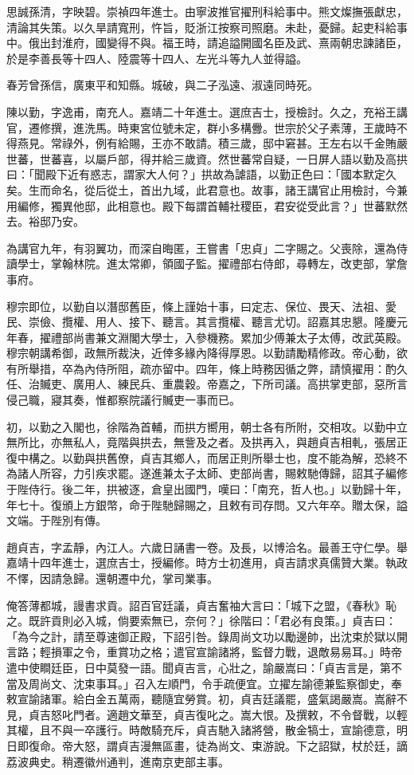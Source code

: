\begin{pinyinscope}
思誠孫清，字映碧。崇禎四年進士。由寧波推官擢刑科給事中。熊文燦撫張獻忠，清論其失策。以久旱請寬刑，忤旨，貶浙江按察司照磨。未赴，憂歸。起吏科給事中。俄出封淮府，國變得不與。福王時，請追謚開國名臣及武、熹兩朝忠諫諸臣，於是李善長等十四人、陸震等十四人、左光斗等九人並得謚。

春芳曾孫信，廣東平和知縣。城破，與二子泓遠、淑遠同時死。

陳以勤，字逸甫，南充人。嘉靖二十年進士。選庶吉士，授檢討。久之，充裕王講官，遷修撰，進洗馬。時東宮位號未定，群小多構釁。世宗於父子素薄，王歲時不得燕見。常祿外，例有給賜，王亦不敢請。積三歲，邸中窘甚。王左右以千金賄嚴世蕃，世蕃喜，以屬戶部，得并給三歲資。然世蕃常自疑，一日屏人語以勤及高拱曰：「聞殿下近有惑志，謂家大人何？」拱故為謔語，以勤正色曰：「國本默定久矣。生而命名，從后從土，首出九域，此君意也。故事，諸王講官止用檢討，今兼用編修，獨異他邸，此相意也。殿下每謂首輔社稷臣，君安從受此言？」世蕃默然去。裕邸乃安。

為講官九年，有羽翼功，而深自晦匿，王嘗書「忠貞」二字賜之。父喪除，還為侍讀學士，掌翰林院。進太常卿，領國子監。擢禮部右侍郎，尋轉左，改吏部，掌詹事府。

穆宗即位，以勤自以潛邸舊臣，條上謹始十事，曰定志、保位、畏天、法祖、愛民、崇儉、攬權、用人、接下、聽言。其言攬權、聽言尤切。詔嘉其忠懇。隆慶元年春，擢禮部尚書兼文淵閣大學士，入參機務。累加少傅兼太子太傅，改武英殿。穆宗朝講希御，政無所裁決，近倖多緣內降得厚恩。以勤請勵精修政。帝心動，欲有所舉措，卒為內侍所阻，疏亦留中。四年，條上時務因循之弊，請慎擢用：酌久任、治贓吏、廣用人、練民兵、重農穀。帝嘉之，下所司議。高拱掌吏部，惡所言侵己職，寢其奏，惟都察院議行贓吏一事而已。

初，以勤之入閣也，徐階為首輔，而拱方嚮用，朝士各有所附，交相攻。以勤中立無所比，亦無私人，竟階與拱去，無訾及之者。及拱再入，與趙貞吉相軋，張居正復中構之。以勤與拱舊僚，貞吉其鄉人，而居正則所舉士也，度不能為解，恐終不為諸人所容，力引疾求罷。遂進兼太子太師、吏部尚書，賜敕馳傳歸，詔其子編修于陛侍行。後二年，拱被逐，倉皇出國門，嘆曰：「南充，哲人也。」以勤歸十年，年七十。復頒上方銀幣，命于陛馳歸賜之，且敕有司存問。又六年卒。贈太保，謚文端。于陛別有傳。

趙貞吉，字孟靜，內江人。六歲日誦書一卷。及長，以博洽名。最善王守仁學。舉嘉靖十四年進士，選庶吉士，授編修。時方士初進用，貞吉請求真儒贊大業。執政不懌，因請急歸。還朝遷中允，掌司業事。

俺答薄都城，謾書求貢。詔百官廷議，貞吉奮袖大言曰：「城下之盟，《春秋》恥之。既許貢則必入城，倘要索無已，奈何？」徐階曰：「君必有良策。」貞吉曰：「為今之計，請至尊速御正殿，下詔引咎。錄周尚文功以勵邊帥，出沈束於獄以開言路；輕損軍之令，重賞功之格；遣官宣諭諸將，監督力戰，退敵易易耳。」時帝遣中使瞷廷臣，日中莫發一語。聞貞吉言，心壯之，諭嚴嵩曰：「貞吉言是，第不當及周尚文、沈束事耳。」召入左順門，令手疏便宜。立擢左諭德兼監察御史，奉敕宣諭諸軍。給白金五萬兩，聽隨宜勞賞。初，貞吉廷議罷，盛氣謁嚴嵩。嵩辭不見，貞吉怒叱門者。適趙文華至，貞吉復叱之。嵩大恨。及撰敕，不令督戰，以輕其權，且不與一卒護行。時敵騎充斥，貞吉馳入諸將營，散金犒士，宣諭德意，明日即復命。帝大怒，謂貞吉漫無區畫，徒為尚文、束游說。下之詔獄，杖於廷，謫荔波典史。稍遷徽州通判，進南京吏部主事。


\end{pinyinscope}
